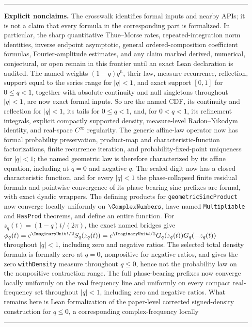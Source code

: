 \documentclass[11pt,oneside]{article}
\theoremstyle{definition}
\theoremstyle{remark}
\newenvironment{boxedremark}{%
  \par\smallskip\noindent\begin{center}\begin{minipage}{0.94\textwidth}%
  \color{black}\hrule\vspace{0.6em}\small
}{%
  \vspace{0.6em}\hrule\end{minipage}\end{center}\smallskip
}
\begin{document}
\begin{boxedremark}
\textbf{Explicit nonclaims.}
The crosswalk identifies formal inputs and nearby APIs; it is not a claim that every formula
in the corresponding part is formalized.  In particular, the sharp quantitative
Thue--Morse rates, repeated-integration norm identities, inverse endpoint asymptotic,
general ordered-composition coefficient formulas, Fourier-amplitude estimates, and any
claim marked derived, numerical, conjectural, or open remain in this frontier until an exact
Lean declaration is audited.  The named weights \((1-q)q^n\), their law, measure recurrence,
reflection, support equal to the series range for \(|q|<1\), and exact support \([0,1]\) for
\(0\le q<1\), together with absolute continuity and null singletons throughout \(|q|<1\),
are now exact formal inputs.  So are the named CDF, its continuity and reflection for
\(|q|<1\), its tails for \(0\le q<1\), and, for \(0<q<1\), its refinement integrals,
explicit compactly supported density, measure-level Radon--Nikodym identity, and real-space
\(C^\infty\) regularity.  The generic affine-law operator now has formal probability
preservation, product-map and characteristic-function factorizations, finite recurrence
iteration, and probability-fixed-point uniqueness for \(|q|<1\); the named geometric law is
therefore characterized by its affine equation, including at \(q=0\) and negative \(q\).
The scaled digit now has a closed characteristic function, and for every \(|q|<1\) the
phase-collapsed finite residual formula and pointwise convergence of its phase-bearing sinc
prefixes are formal, with exact dyadic wrappers.  The defining products for
\texttt{geometricSincProduct} now converge locally uniformly on \(\ComplexNumbers\), have named
\texttt{Multipliable} and \texttt{HasProd} theorems, and define an entire function.  For
\(z_q(t)=(1-q)t/(2\pi)\), the exact named bridges give
\(\phi_q(t)=e^{\ImaginaryUnit t/2}S_q(z_q(t))
=e^{\ImaginaryUnit t/2}G_q(z_q(t))G_q(-z_q(t))\) throughout \(|q|<1\), including zero
and negative ratios.  The selected total density formula is formally zero at \(q=0\),
nonpositive for negative ratios, and gives the zero \texttt{withDensity} measure throughout
\(q\le0\), hence not the probability law on the nonpositive contraction range.  The full
phase-bearing prefixes now converge locally uniformly on the real frequency line and
uniformly on every compact real-frequency set throughout \(|q|<1\), including zero and
negative ratios.  What remains here is Lean formalization of the paper-level corrected
signed-density construction for \(q\le0\), a corresponding complex-frequency locally

\end{boxedremark}
\end{document}
